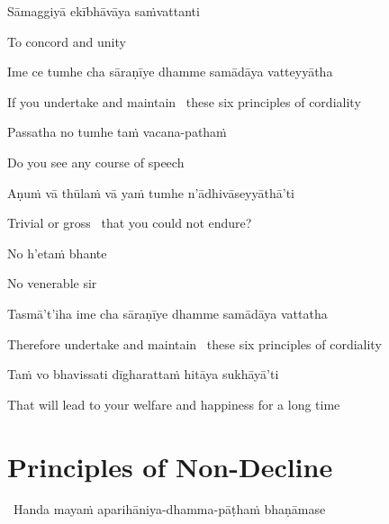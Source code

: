 Sāmaggiyā ekībhāvāya saṁvattanti

\begin{english}
  To concord and unity
\end{english}

\suttaRef{[MN 48]}

Ime ce tumhe cha sāraṇīye dhamme samādāya vatteyyātha

\begin{english}
  If you undertake and maintain \breathmark\ these six principles of cordiality
\end{english}

Passatha no tumhe taṁ vacana-pathaṁ

\begin{english}
  Do you see any course of speech
\end{english}

Aṇuṁ vā thūlaṁ vā yaṁ tumhe n'ādhivāseyyāthā'ti

\begin{english}
  Trivial or gross \breathmark\ that you could not endure?
\end{english}

No h'etaṁ bhante

\begin{english}
  No venerable sir
\end{english}

Tasmā't'iha ime cha sāraṇīye dhamme samādāya vattatha

\begin{english}
  Therefore undertake and maintain \breathmark\ these six principles of cordiality
\end{english}

Taṁ vo bhavissati dīgharattaṁ hitāya sukhāyā'ti

\begin{english}
  That will lead to your welfare and happiness for a long time
\end{english}

\suttaRef{[MN 104]}


\section{Principles of Non-Decline}
\label{principles-of-non-decline}

\begin{leader}
  \anglebracketleft\ \hspace{-0.5mm}Handa mayaṁ aparihāniya-dhamma-pāṭhaṁ bhaṇāmase \hspace{-0.5mm}\anglebracketright\
\end{leader}

